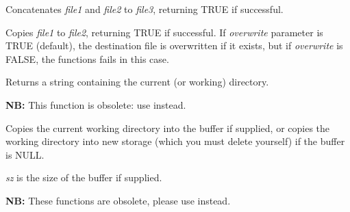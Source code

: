 Concatenates {\it file1} and {\it file2} to {\it file3}, returning
TRUE if successful.

\label{wxcopyfile}


Copies {\it file1} to {\it file2}, returning TRUE if successful. If
{\it overwrite} parameter is TRUE (default), the destination file is overwritten
if it exists, but if {\it overwrite} is FALSE, the functions fails in this
case.

\label{wxgetcwd}


Returns a string containing the current (or working) directory.

\label{wxgetworkingdirectory}


{\bf NB:} This function is obsolete: use  instead.

Copies the current working directory into the buffer if supplied, or
copies the working directory into new storage (which you must delete yourself)
if the buffer is NULL.

{\it sz} is the size of the buffer if supplied.

\label{wxgettempfilename}




{\bf NB:} These functions are obsolete, please use\rtfsp
{}\rtfsp
instead.

